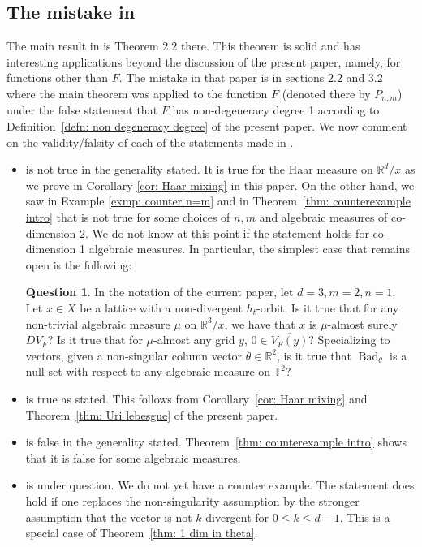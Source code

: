 \documentclass[reqno,11pt, twoside]{amsart}
\theoremstyle{plain}
\theoremstyle{definition}
\newtheorem{ques}[thm]{Question}
\theoremstyle{definition}
\theoremstyle{remark}
\numberwithin{equation}{section}
\newcommand{\bR}{\mathbb{R}}
\newcommand{\bT}{\mathbb{T}}
\newcommand\on[1]{\operatorname{#1}}
\begin{document}
\subsection{The mistake in \cite{GDV}}\label{sec: the mistake}
The main result in \cite{GDV} is Theorem $2.2$ there. This theorem is solid and has interesting applications beyond the discussion of the present paper, namely, for functions other than $F$. The mistake in that paper 
is in sections $2.2$ and $3.2$ where the main theorem was applied to the function $F$ (denoted there by $P_{n,m}$) under the false statement that 
$F$ has non-degeneracy degree 1 according to Definition~\ref{defn: non degeneracy degree} of the present paper. We now comment on the validity/falsity of each of the statements 
made in \cite[\S 2.2, \S 3.2]{GDV}. 
\begin{itemize}
    \item \cite[Theorem 2.3]{GDV} is not true in the generality stated. It is true for the Haar measure on $\bR^d/x$ as we prove in Corollary
    \ref{cor: Haar mixing} in this paper. On the other hand, we saw in Example \ref{exmp: counter n=m} and in Theorem~\ref{thm: counterexample intro} that  \cite[Theorem 2.3]{GDV} is not true for some choices of $n,m$ and algebraic measures of 
    co-dimension 2. We do not know at this point if the statement holds for co-dimension 1 algebraic measures. In particular, the simplest case that remains open is the following:
    \begin{ques}\label{ques: is it true}
        In the notation of the current paper, let $d=3, m=2, n=1$. Let $x\in X$ be a lattice with a non-divergent $h_t$-orbit. Is it true that for any non-trivial algebraic measure $\mu$ on $\bR^3/x$, we have that $x$ is $\mu$-almost surely $DV_F$? Is it true that for $\mu$-almost any grid $y$, $0\in \overline{V_F(y)}$? Specializing to vectors, given a non-singular column vector $\theta\in \bR^2$, is it true that 
        $\on{Bad}_\theta$ is a null set with respect to any algebraic measure 
        on $\bT^2$?
    \end{ques}
    \item \cite[Theorem 3.4]{GDV} is true as stated. This follows from Corollary~\ref{cor: Haar mixing} and Theorem~\ref{thm: Uri lebesgue} of 
    the present paper.
    \item \cite[Theorem 3.7]{GDV} is false in the generality stated. Theorem~\ref{thm: counterexample intro} shows that it is false for some algebraic measures.
    \item
    \cite[Corollary 3.8]{GDV} is under question. We do not yet have a counter example. The statement does hold if one replaces the non-singularity assumption by the stronger assumption that the vector is not 
    $k$-divergent for $0\le k\le d-1$. This is a special case of Theorem~\ref{thm: 1 dim in theta}.  
    \end{itemize}
\end{document}
